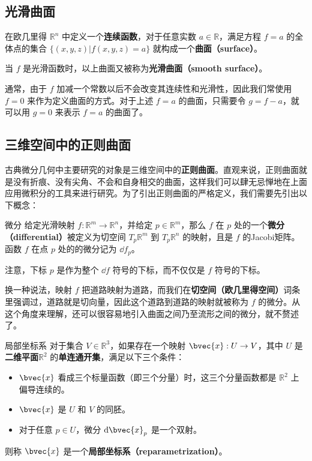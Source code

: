 
\subsection{光滑曲面}

在欧几里得 $\mathbb{R}^n$ 中定义一个\textbf{连续函数}，对于任意实数 $a\in\mathbb{R}$，满足方程 $f=a$ 的全体点的集合 $\{(x, y, z)|f(x, y, z)=a\}$ 就构成一个\textbf{曲面（surface）}。

当 $f$ 是光滑函数时，以上曲面又被称为\textbf{光滑曲面（smooth surface）}。

通常，由于 $f$ 加减一个常数以后不会改变其连续性和光滑性，因此我们常使用 $f=0$ 来作为定义曲面的方式。对于上述 $f=a$ 的曲面，只需要令 $g=f-a$，就可以用 $g=0$ 来表示 $f=a$ 的曲面了。

\subsection{三维空间中的正则曲面}

古典微分几何中主要研究的对象是三维空间中的\textbf{正则曲面}。直观来说，正则曲面就是没有折痕、没有尖角、不会和自身相交的曲面，这样我们可以肆无忌惮地在上面应用微积分的工具来进行研究。为了引出正则曲面的严格定义，我们需要先引出以下概念：

\begin{definition}{微分}
给定光滑映射 $f:\mathbb{R}^m\to\mathbb{R}^n$，并给定 $p\in\mathbb{R}^m$，那么 $f$ 在 $p$ 处的一个\textbf{微分（differential）}被定义为切空间 $T_p\mathbb{R}^m$ 到 $T_p\mathbb{R}^n$ 的映射，且是 $f$ 的Jacobi矩阵。函数 $f$ 在点 $p$ 处的的微分记为 $\dd f_p$。
\end{definition}

注意，下标 $p$ 是作为整个 $\dd f$ 符号的下标，而不仅仅是 $f$ 符号的下标。

换一种说法，映射 $f$ 把道路映射为道路，而我们在\textbf{切空间（欧几里得空间）}词条里强调过，道路就是切向量，因此这个道路到道路的映射就被称为 $f$ 的微分。从这个角度来理解，还可以很容易地引入曲面之间乃至流形之间的微分，就不赘述了。


\begin{definition}{局部坐标系}
对于集合 $V\in \mathbb{R}^3$，如果存在一个映射 $\bvec{x}:U\to V$，其中 $U$ 是\textbf{二维平面}$\mathbb{R}^2$ 的\textbf{单连通开集}，满足以下三个条件：
\begin{itemize}
\item $\bvec{x}$ 看成三个标量函数（即三个分量）时，这三个分量函数都是 $\mathbb{R}^2$ 上偏导连续的。
\item $\bvec{x}$ 是 $U$ 和 $V$ 的同胚。
\item 对于任意 $p\in U$，微分 $\mathrm{d}\bvec{x}_p$ 是一个双射。
\end{itemize}
则称 $\bvec{x}$ 是一个\textbf{局部坐标系（reparametrization）}。
\end{definition}

